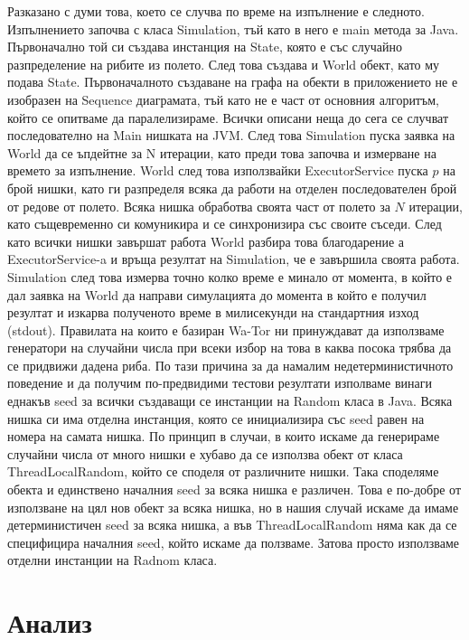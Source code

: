 \documentclass[12pt]{article}
\begin{document}
Разказано с думи това, което се случва по време на изпълнение е следното. Изпълнението започва с класа Simulation,
тъй като в него е main метода за Java. Първоначално той си създава инстанция на State, която е със случайно
разпределение на рибите из полето. След това създава и World обект, като му подава State. Първоначалното
създаване на графа на обекти в приложението не е изобразен на Sequence диаграмата, тъй като не е част от основния
алгоритъм, който се опитваме да паралелизираме. Всички описани неща до сега се случват последователно на
Main нишката на JVM. След това Simulation пуска заявка на World да се ъпдейтне за N итерации, като преди това
започва и измерване на времето за изпълнение. World след това използвайки ExecutorService пуска $p$ на брой
нишки, като ги разпределя всяка да работи на отделен последователен брой от редове от полето. Всяка нишка
обработва своята част от полето за $N$ итерации, като същевременно си комуникира и се синхронизира със своите
съседи. След като всички нишки завършат работа World разбира това благодарение а ExecutorService-a и
връща резултат на Simulation, че е завършила своята работа. Simulation след това измерва точно колко време
е минало от момента, в който е дал заявка на World да направи симулацията до момента в който е получил
резултат и изкарва полученото време в милисекунди на стандартния изход (stdout).
\bigbreak
Правилата на които е базиран Wa-Tor ни принуждават да използваме генератори на случайни числа при всеки избор на това
в каква посока трябва да се придвижи дадена риба. По тази причина за да намалим недетерминистичното поведение
и да получим по-предвидими тестови резултати изполваме винаги еднакъв seed за всички създаващи се инстанции
на Random класа в Java. Всяка нишка си има отделна инстанция, която се инициализира със seed равен на номера на самата нишка.
По принцип в случаи, в които искаме да генерираме случайни числа от много нишки е хубаво да се използва
обект от класа ThreadLocalRandom, който се споделя от различните нишки. Така споделяме обекта и единствено
началния seed за всяка нишка е различен. Това е по-добре от използване на цял нов обект за всяка нишка,
но в нашия случай искаме да имаме детерминистичен seed за всяка нишка, а във ThreadLocalRandom няма 
как да се специфицира началния seed, който искаме да ползваме. Затова просто използваме отделни инстанции
на Radnom класа.

\section{Анализ}
\end{document}
